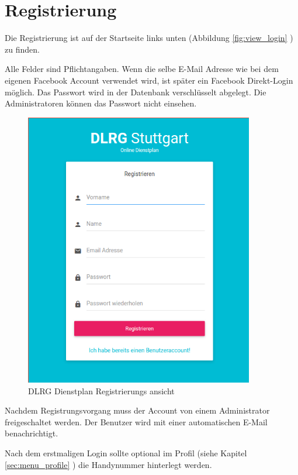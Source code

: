 \chapter{Registrierung}
\label{cha:register}

Die Registrierung ist auf der Startseite links unten (Abbildung  \ref{fig:view_login} \textit{}) zu finden.

\vspace*{5mm} \noindent Alle Felder sind Pflichtangaben. Wenn die selbe E-Mail Adresse wie bei dem eigenen Facebook Account verwendet wird, ist später ein Facebook Direkt-Login möglich. Das Passwort wird in der Datenbank verschlüsselt abgelegt. Die Administratoren können das Passwort nicht einsehen.

\begin{figure}[h]
 \begin{addmargin}{-0.2\linewidth}
   \centering 
   \includegraphics[width=10cm]{Bilder/view_register.png}
 \end{addmargin} 
 \caption[Registrierungs ansicht]{DLRG Dienstplan Registrierungs ansicht}
 \label{fig:view_register}
\end{figure}

\vspace*{5mm} \noindent 
Nachdem Registrungsvorgang muss der Account von einem Administrator freigeschaltet werden. Der Benutzer wird mit einer automatischen E-Mail benachrichtigt.

\noindent Nach dem erstmaligen Login sollte optional im Profil (siehe Kapitel \ref{sec:menu_profile} \textit{}) die Handynummer hinterlegt werden.